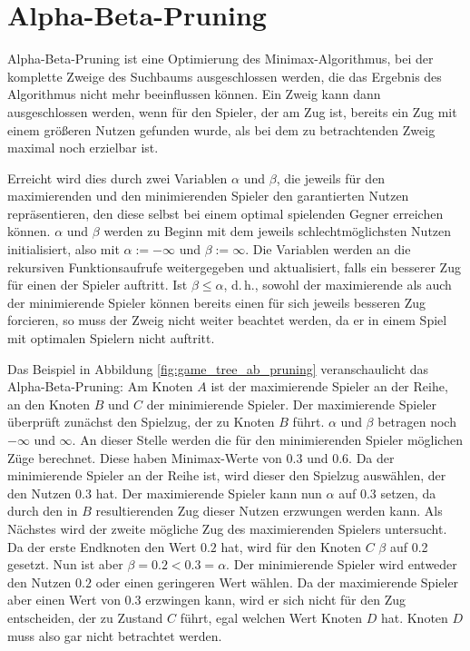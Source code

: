 \section{Alpha-Beta-Pruning}
\label{sec:alphabeta}

Alpha-Beta-Pruning ist eine Optimierung des Minimax-Algorithmus, bei der komplette Zweige des Suchbaums ausgeschlossen
werden, die das Ergebnis des Algorithmus nicht mehr beeinflussen können. Ein Zweig kann dann ausgeschlossen werden, wenn
für den Spieler, der am Zug ist, bereits ein Zug mit einem größeren Nutzen gefunden wurde, als bei dem zu betrachtenden Zweig
maximal noch erzielbar ist.

Erreicht wird dies durch zwei Variablen $\alpha$ und $\beta$, die jeweils für den maximierenden und den minimierenden
Spieler den garantierten Nutzen repräsentieren, den diese selbst bei einem optimal spielenden Gegner erreichen können.
$\alpha$ und $\beta$ werden zu Beginn mit dem jeweils schlechtmöglichsten Nutzen initialisiert, also mit $\alpha :=
-\infty$ und $\beta := \infty$. Die Variablen werden an die rekursiven Funktionsaufrufe weitergegeben und aktualisiert,
falls ein besserer Zug für einen der Spieler auftritt. Ist $\beta \le \alpha$, d.\,h., sowohl der maximierende als auch
der minimierende Spieler können bereits einen für sich jeweils besseren Zug forcieren, so muss der Zweig nicht weiter
beachtet werden, da er in einem Spiel mit optimalen Spielern nicht auftritt.
\cite[S.~167]{ai2010russel}

Das Beispiel in Abbildung \ref{fig:game_tree_ab_pruning} veranschaulicht das Alpha-Beta-Pruning: Am Knoten $A$ ist der
maximierende Spieler an der Reihe, an den Knoten $B$ und $C$ der minimierende Spieler. Der maximierende Spieler
überprüft zunächst den Spielzug, der zu Knoten $B$ führt. $\alpha$ und $\beta$ betragen noch $-\infty$ und $\infty$. An
dieser Stelle werden die für den minimierenden Spieler möglichen Züge berechnet. Diese haben Minimax-Werte von $0.3$ und
$0.6$. Da der minimierende Spieler an der Reihe ist, wird dieser den Spielzug auswählen, der den Nutzen $0.3$ hat. Der
maximierende Spieler kann nun $\alpha$ auf 0.3 setzen, da durch den in $B$ resultierenden Zug dieser Nutzen erzwungen
werden kann. Als Nächstes wird der zweite mögliche Zug des maximierenden Spielers untersucht. Da der erste Endknoten den
Wert $0.2$ hat, wird für den Knoten $C$ $\beta$ auf 0.2 gesetzt. Nun ist aber $\beta=0.2<0.3=\alpha$. Der minimierende
Spieler wird entweder den Nutzen $0.2$ oder einen geringeren Wert wählen. Da der maximierende Spieler aber einen Wert
von $0.3$ erzwingen kann, wird er sich nicht für den Zug entscheiden, der zu Zustand $C$ führt, egal welchen Wert Knoten
$D$ hat. Knoten $D$ muss also gar nicht betrachtet werden.

